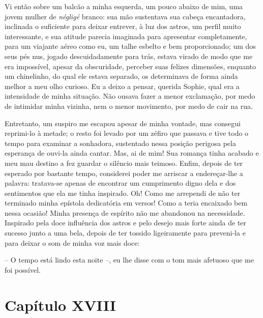  Vi então sobre um balcão a minha esquerda, um pouco abaixo de mim, uma
jovem mulher de \textit{négligé} branco: sua mão sustentava sua cabeça
encantadora, inclinada o suficiente para deixar entrever, à luz dos
astros, um perfil muito interessante, e sua atitude parecia imaginada
para apresentar completamente, para um viajante aéreo como eu, um talhe
esbelto e bem proporcionado; um dos seus pés nus, jogado
descuidadamente para trás, estava virado de modo que me era impossível,
apesar da obscuridade, perceber suas felizes dimensões, enquanto um
chinelinho, do qual ele estava separado, os determinava de forma ainda
melhor a meu olho curioso. Eu a deixo a pensar, querida Sophie, qual
era a intensidade de minha situação. Não ousava fazer a menor
exclamação, por medo de intimidar minha vizinha, nem o menor movimento,
por medo de cair na rua.

 Entretanto, um suspiro me escapou apesar de minha vontade, mas consegui
reprimi-lo à metade; o resto foi levado por um zéfiro que passava e
tive todo o tempo para examinar a sonhadora, sustentado nessa posição
perigosa pela esperança de ouvi-la ainda cantar. Mas, ai de mim! Sua
romança tinha acabado e meu mau destino a fez guardar o silêncio mais
teimoso. Enfim, depois de ter esperado por bastante tempo, considerei
poder me arriscar a endereçar-lhe a palavra: tratava-se apenas de
encontrar um cumprimento digno dela e dos sentimentos que ela me tinha
inspirado. Oh! Como me arrependi de não ter terminado minha epístola
dedicatória em versos! Como a teria encaixado bem nessa ocasião! Minha
presença de espírito não me abandonou na necessidade. Inspirado pela
doce influência dos astros e pelo desejo mais forte ainda de ter
sucesso junto a uma bela, depois de ter tossido ligeiramente para
preveni-la e para deixar o som de minha voz mais doce:

 -- O tempo está lindo esta noite --, eu lhe disse com o tom mais
afetuoso que me foi possível.

\section*{Capítulo XVIII}

